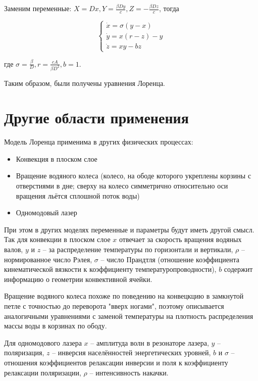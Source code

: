 \documentclass[12pt]{article}
\begin{document}
Заменим переменные: $X=Dx, Y=\frac{\beta Dy}{c}, Z=-\frac{\beta Dz}{c}$, тогда

$$\begin{cases}	
	\dot{x} = \sigma (y-x) \\
	\dot{y} = x(r-z)-y \\
	\dot{z} = xy-bz
\end{cases}$$

где $\sigma = \frac{\beta}{D}, r=\frac{cA}{\beta D^2}, b=1$.

Таким образом, были получены уравнения Лоренца.

\section{Другие области применения}

Модель Лоренца применима в других физических процессах:
\begin{itemize}
	\item Конвекция в плоском слое
	\item Вращение водяного колеса (колесо, на ободе которого укреплены корзины с отверстиями в дне; сверху на колесо симметрично относительно оси вращения льётся сплошной поток воды)
	\item Одномодовый лазер
\end{itemize}

При этом в других моделях переменные и параметры будут иметь другой смысл. Так для конвекции в плоском слое $x$ отвечает за скорость вращения водяных валов, $y$ и $z$ -- за распределение температуры по горизонтали и вертикали, $\rho$ -- нормированное число Рэлея, $\sigma$ -- число Прандтля (отношение коэффициента кинематической вязкости к коэффициенту температуропроводности), $b$ содержит информацию о геометрии конвективной ячейки. 

Вращение водяного колеса похоже по поведению на конвецкцию в замкнутой петле с точностью до переворота "вверх ногами", поэтому описывается аналогичными уравнениями с заменой температуры на плотность распределения массы воды в корзинах по ободу.

Для одномодового лазера $x$ -- амплитуда волн в резонаторе лазера, $y$ -- поляризация, $z$ -- инверсия населённостей энергетических уровней, $b$ и $\sigma$ -- отношения коэффициентов релаксации инверсии и поля к коэффициенту релаксации поляризации, $\rho$ -- интенсивность накачки.
\end{document}
